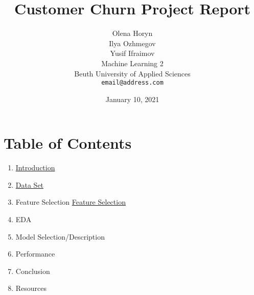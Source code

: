 \documentclass[12pt,fleqn,leqno,letterpaper]{article}
\title{Customer Churn Project Report}
\author{Olena Horyn\\
        Ilya Ozhmegov\\
        Yusif Ifraimov\\
  \small{Machine Learning 2}\\
  \small{Beuth University of Applied Sciences }\\
  \small{\texttt{email@address.com}}
  

}
\date{January 10, 2021}
\begin{document}
\maketitle

\newpage

\section*{Table of Contents}
{\large
\begin {enumerate} 
\bfseries
	\item 
	    \hyperref[introduction]{Introduction}
	\item 
	    \hyperref[dataset]{Data Set}
	\item Feature Selection
	    \hyperref[featureselection]{Feature Selection}
	\item EDA
	\item Model Selection/Description
	\item Performance
	\item Conclusion
	\item Resources
\end{enumerate}
}


\newpage

\newpage

\newpage





\end{document}
